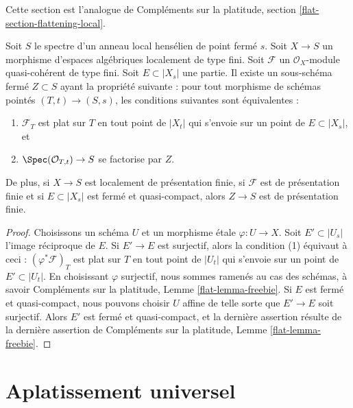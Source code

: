 \noindent
Cette section est l'analogue de Compléments sur la platitude, section
\ref{flat-section-flattening-local}.

\begin{lemma}
\label{lemma-freebie}
Soit $S$ le spectre d'un anneau local hensélien de point fermé $s$.
Soit $X \to S$ un morphisme d'espaces algébriques
localement de type fini.
Soit $\mathcal{F}$ un $\mathcal{O}_X$-module quasi-cohérent de type fini.
Soit $E \subset |X_s|$ une partie. Il existe un sous-schéma fermé
$Z \subset S$ ayant la propriété suivante : pour tout morphisme de schémas
pointés $(T, t) \to (S, s)$, les conditions suivantes sont équivalentes :
\begin{enumerate}
\item $\mathcal{F}_T$ est plat sur $T$ en tout point de
$|X_t|$ qui s'envoie sur un point de $E \subset |X_s|$, et
\item $\Spec(\mathcal{O}_{T, t}) \to S$ se factorise par $Z$.
\end{enumerate}
De plus, si $X \to S$ est localement de présentation finie,
si $\mathcal{F}$ est de présentation finie et si $E \subset |X_s|$ est
fermé et quasi-compact, alors $Z \to S$ est de présentation finie.
\end{lemma}

\begin{proof}
Choisissons un schéma $U$ et un morphisme \'etale $\varphi : U \to X$.
Soit $E' \subset |U_s|$ l'image réciproque de $E$. Si
$E' \to E$ est surjectif, alors la condition (1) équivaut à ceci :
$(\varphi^*\mathcal{F})_T$ est plat sur $T$ en tout point de
$|U_t|$ qui s'envoie sur un point de $E' \subset |U_t|$.
En choisissant $\varphi$ surjectif, nous sommes ramenés au cas des schémas, à savoir
Compléments sur la platitude, Lemme \ref{flat-lemma-freebie}.
Si $E$ est fermé et quasi-compact, nous pouvons choisir $U$
affine de telle sorte que $E' \to E$ soit surjectif. Alors $E'$ est fermé
et quasi-compact, et la dernière assertion résulte de la
dernière assertion de
Compléments sur la platitude, Lemme \ref{flat-lemma-freebie}.
\end{proof}









\section{Aplatissement universel}
\label{section-flattening-final}

